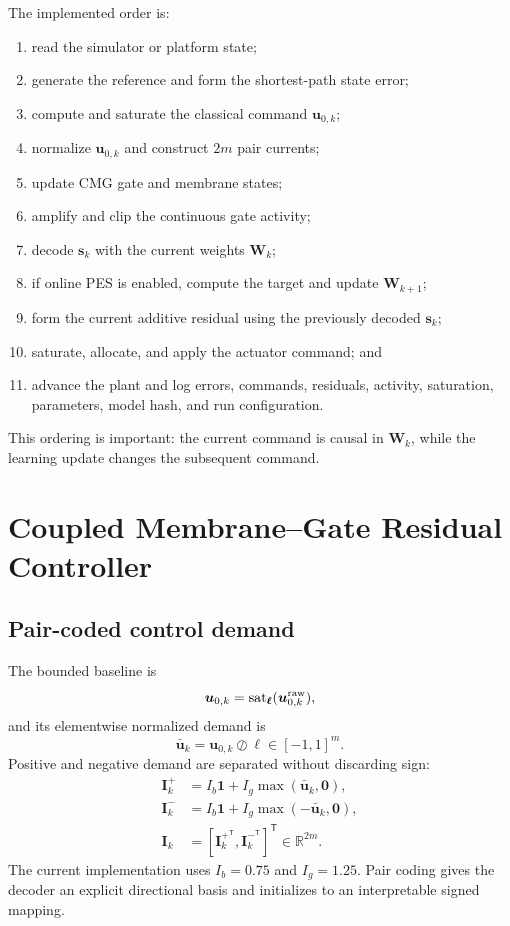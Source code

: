 \documentclass[10pt,twocolumn]{article}
\newcommand{\sat}{\operatorname{sat}}
\newcommand{\R}{\mathbb{R}}
\newcommand{\T}{^{\mathsf T}}
\begin{document}
The implemented order is:
\begin{enumerate}
    \item read the simulator or platform state;
    \item generate the reference and form the shortest-path state error;
    \item compute and saturate the classical command $\bm u_{0,k}$;
    \item normalize $\bm u_{0,k}$ and construct $2m$ pair currents;
    \item update CMG gate and membrane states;
    \item amplify and clip the continuous gate activity;
    \item decode $\bm s_k$ with the current weights $\bm W_k$;
    \item if online PES is enabled, compute the target and update
    $\bm W_{k+1}$;
    \item form the current additive residual using the previously decoded
    $\bm s_k$;
    \item saturate, allocate, and apply the actuator command; and
    \item advance the plant and log errors, commands, residuals, activity,
    saturation, parameters, model hash, and run configuration.
\end{enumerate}

This ordering is important: the current command is causal in $\bm W_k$, while
the learning update changes the subsequent command.

\section{Coupled Membrane--Gate Residual Controller}

\subsection{Pair-coded control demand}

The bounded baseline is
\begin{equation}
    \bm u_{0,k}=\sat_{\bm\ell}(\bm u^{\rm raw}_{0,k}),
\end{equation}
and its elementwise normalized demand is
\begin{equation}
    \bar{\bm u}_k=\bm u_{0,k}\oslash\bm\ell\in[-1,1]^m.
\end{equation}
Positive and negative demand are separated without discarding sign:
\begin{align}
    \bm I_k^+ &= I_b\bm 1+I_g\max(\bar{\bm u}_k,\bm 0),\\
    \bm I_k^- &= I_b\bm 1+I_g\max(-\bar{\bm u}_k,\bm 0),\\
    \bm I_k &= [\bm I_k^{+\T},\bm I_k^{-\T}]\T\in\R^{2m}.
\end{align}
The current implementation uses $I_b=0.75$ and $I_g=1.25$. Pair coding gives
the decoder an explicit directional basis and initializes to an interpretable
signed mapping.
\end{document}
